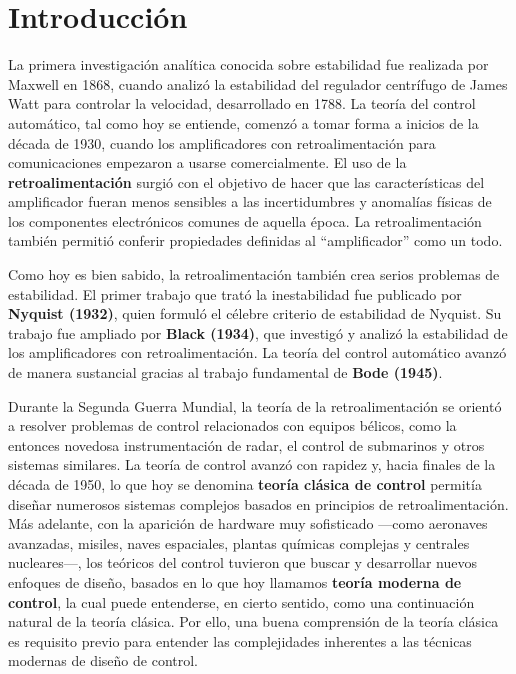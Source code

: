 
\chapter{Introducción}

La primera investigación analítica conocida sobre estabilidad fue realizada por Maxwell en 1868, cuando analizó la estabilidad del regulador centrífugo de James Watt para controlar la velocidad, desarrollado en 1788. La teoría del control automático, tal como hoy se entiende, comenzó a tomar forma a inicios de la década de 1930, cuando los amplificadores con retroalimentación para comunicaciones empezaron a usarse comercialmente. El uso de la \textbf{retroalimentación} surgió con el objetivo de hacer que las características del amplificador fueran menos sensibles a las incertidumbres y anomalías físicas de los componentes electrónicos comunes de aquella época. La retroalimentación también permitió conferir propiedades definidas al “amplificador” como un todo.

Como hoy es bien sabido, la retroalimentación también crea serios problemas de estabilidad. El primer trabajo que trató la inestabilidad fue publicado por \textbf{Nyquist (1932)}, quien formuló el célebre criterio de estabilidad de Nyquist. Su trabajo fue ampliado por \textbf{Black (1934)}, que investigó y analizó la estabilidad de los amplificadores con retroalimentación. La teoría del control automático avanzó de manera sustancial gracias al trabajo fundamental de \textbf{Bode (1945)}.

Durante la Segunda Guerra Mundial, la teoría de la retroalimentación se orientó a resolver problemas de control relacionados con equipos bélicos, como la entonces novedosa instrumentación de radar, el control de submarinos y otros sistemas similares. La teoría de control avanzó con rapidez y, hacia finales de la década de 1950, lo que hoy se denomina \textbf{teoría clásica de control} permitía diseñar numerosos sistemas complejos basados en principios de retroalimentación. Más adelante, con la aparición de hardware muy sofisticado —como aeronaves avanzadas, misiles, naves espaciales, plantas químicas complejas y centrales nucleares—, los teóricos del control tuvieron que buscar y desarrollar nuevos enfoques de diseño, basados en lo que hoy llamamos \textbf{teoría moderna de control}, la cual puede entenderse, en cierto sentido, como una continuación natural de la teoría clásica. Por ello, una buena comprensión de la teoría clásica es requisito previo para entender las complejidades inherentes a las técnicas modernas de diseño de control.

